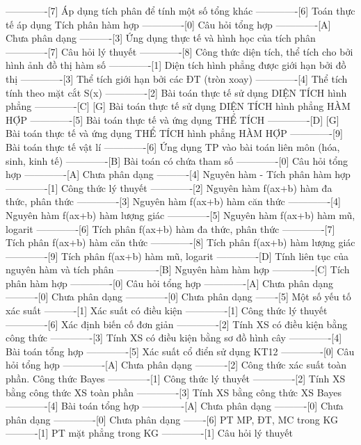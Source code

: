 -------------[7] Áp dụng tích phân để tính một số tổng khác
-------------[6] Toán thực tế áp dụng Tích phân hàm hợp
-------------[0] Câu hỏi tổng hợp
-------------[A] Chưa phân dạng
----------[3] Ứng dụng thực tế và hình học của tích phân
-------------[7] Câu hỏi lý thuyết
-------------[8] Công thức diện tích, thể tích cho bởi hình ảnh đồ thị hàm số
-------------[1] Diện tích hình phẳng được giới hạn bởi đồ thị
-------------[3] Thể tích giới hạn bởi các ĐT (tròn xoay)
-------------[4] Thể tích tính theo mặt cắt S(x)
-------------[2] Bài toán thực tế sử dụng DIỆN TÍCH hình phẳng
-------------[C] [G] Bài toán thực tế sử dụng DIỆN TÍCH hình phẳng HÀM HỢP
-------------[5] Bài toán thực tế và ứng dụng THỂ TÍCH
-------------[D] [G] Bài toán thực tế và ứng dụng THỂ TÍCH hình phẳng HÀM HỢP
-------------[9] Bài toán thực tế vật lí
-------------[6] Ứng dụng TP vào bài toán liên môn (hóa, sinh, kinh tế)
-------------[B] Bài toán có chứa tham số
-------------[0] Câu hỏi tổng hợp
-------------[A] Chưa phân dạng
----------[4] Nguyên hàm - Tích phân hàm hợp
-------------[1] Công thức lý thuyết
-------------[2] Nguyên hàm f(ax+b) hàm đa thức, phân thức
-------------[3] Nguyên hàm f(ax+b) hàm căn thức
-------------[4] Nguyên hàm f(ax+b) hàm lượng giác
-------------[5] Nguyên hàm f(ax+b) hàm mũ, logarit
-------------[6] Tích phân f(ax+b) hàm đa thức, phân thức
-------------[7] Tích phân f(ax+b) hàm căn thức
-------------[8] Tích phân f(ax+b) hàm lượng giác
-------------[9] Tích phân f(ax+b) hàm mũ, logarit
-------------[D] Tính liên tục của nguyên hàm và tích phân
-------------[B] Nguyên hàm hàm hợp
-------------[C] Tích phân hàm hợp
-------------[0] Câu hỏi tổng hợp
-------------[A] Chưa phân dạng
----------[0] Chưa phân dạng
-------------[0] Chưa phân dạng
-------[5] Một số yếu tố xác suất
----------[1] Xác suất có điều kiện
-------------[1] Công thức lý thuyết
-------------[6] Xác định biến cố đơn giản
-------------[2] Tính XS có điều kiện bằng công thức
-------------[3] Tính XS có điều kiện bằng sơ đồ hình cây
-------------[4] Bài toán tổng hợp
-------------[5] Xác suất cổ điển sử dụng KT12
-------------[0] Câu hỏi tổng hợp
-------------[A] Chưa phân dạng
----------[2] Công thức xác suất toàn phần. Công thức Bayes
-------------[1] Công thức lý thuyết
-------------[2] Tính XS bằng công thức XS toàn phần
-------------[3] Tính XS bằng công thức XS Bayes
-------------[4] Bài toán tổng hợp
-------------[A] Chưa phân dạng
----------[0] Chưa phân dạng
-------------[0] Chưa phân dạng
-------[6] PT MP, ĐT, MC trong KG 
----------[1] PT mặt phẳng trong KG
-------------[1] Câu hỏi lý thuyết
